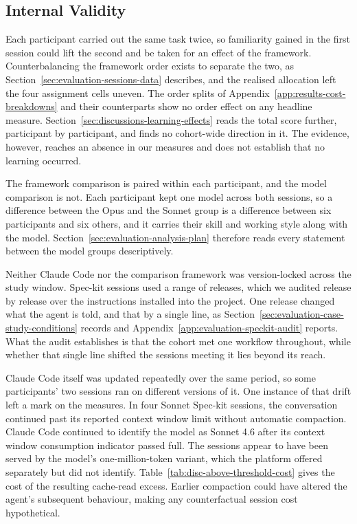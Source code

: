 \subsection{Internal Validity}

Each participant carried out the same task twice, so familiarity gained in the first session could lift the second and be taken for an effect of the framework. Counterbalancing the framework order exists to separate the two, as Section~\ref{sec:evaluation-sessions-data} describes, and the realised allocation left the four assignment cells uneven. The order splits of Appendix~\ref{app:results-cost-breakdowns} and their counterparts show no order effect on any headline measure. Section~\ref{sec:discussions-learning-effects} reads the total score further, participant by participant, and finds no cohort-wide direction in it. The evidence, however, reaches an absence in our measures and does not establish that no learning occurred.

The framework comparison is paired within each participant, and the model comparison is not. Each participant kept one model across both sessions, so a difference between the Opus and the Sonnet group is a difference between six participants and six others, and it carries their skill and working style along with the model. Section~\ref{sec:evaluation-analysis-plan} therefore reads every statement between the model groups descriptively.

Neither Claude Code nor the comparison framework was version-locked across the study window. Spec-kit sessions used a range of releases, which we audited release by release over the instructions installed into the project. One release changed what the agent is told, and that by a single line, as Section~\ref{sec:evaluation-case-study-conditions} records and Appendix~\ref{app:evaluation-speckit-audit} reports. What the audit establishes is that the cohort met one workflow throughout, while whether that single line shifted the sessions meeting it lies beyond its reach.

Claude Code itself was updated repeatedly over the same period, so some participants' two sessions ran on different versions of it. One instance of that drift left a mark on the measures. In four Sonnet Spec-kit sessions, the conversation continued past its reported context window limit without automatic compaction. Claude Code continued to identify the model as Sonnet 4.6 after its context window consumption indicator passed full. The sessions appear to have been served by the model's one-million-token variant, which the platform offered separately but did not identify. Table~\ref{tab:disc-above-threshold-cost} gives the cost of the resulting cache-read excess. Earlier compaction could have altered the agent's subsequent behaviour, making any counterfactual session cost hypothetical.

